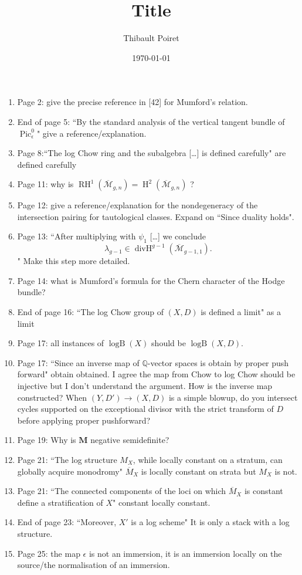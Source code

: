 \documentclass[a4paper,12pt]{amsart} %
\title[Title]{Title}
\author[T. Poiret]{Thibault Poiret}
\date{\today}
\numberwithin{equation}{subsection}
\newcommand{\on}[1]{\operatorname{#1}}
\newcommand{\bb}[1]{{\mathbb{#1}}}
\newcommand{\ca}[1]{{\mathcal{#1}}}
\def\Pic{\operatorname{Pic}}
\def\o#1{\overline{#1}}
\theoremstyle{definition}
\theoremstyle{plain}%
\theoremstyle{remark}
\begin{document}
\begin{enumerate}
	\item Page 2: give the precise reference in [42] for Mumford's relation.
	\item End of page 5: ``By the standard analysis of the vertical tangent bundle of $\Pic^0_{\epsilon}$" give a reference/explanation.
	\item Page 8:``The log Chow ring and the subalgebra [\ldots] is defined carefully" \textrightarrow{} are defined carefully
	\item Page 11: why is $\on{RH}^1(\o{\ca M}_{g,n})=\on{H}^2(\o{\ca M}_{g,n})$ ?
	\item Page 12: give a reference/explanation for the nondegeneracy of the intersection pairing for tautological classes. Expand on ``Since duality holds".
	\item Page 13: ``After multiplying with $\psi_1$ [\ldots] we conclude
	\[
	\lambda_{g-1}\in\on{divH}^{g-1}(\o{\ca M}_{g-1,1}).
	\]" Make this step more detailed.
	\item Page 14: what is Mumford's formula for the Chern character of the Hodge bundle?
	\item End of page 16: ``The log Chow group of $(X,D)$ is defined a limit" \textrightarrow{} as a limit
	\item Page 17: all instances of $\on{logB}(X)$ should be $\on{logB}(X,D)$.
	\item Page 17: ``Since an inverse map of $\bb Q$-vector spaces is obtain by proper push forward" obtain \textrightarrow{} obtained. I agree the map from Chow to log Chow should be injective but I don't understand the argument. How is the inverse map constructed? When $(Y,D') \to (X,D)$ is a simple blowup, do you intersect cycles supported on the exceptional divisor with the strict transform of $D$ before applying proper pushforward?
	\item Page 19: Why is $\mathbf M$ negative semidefinite?
	\item Page 21: ``The log structure $M_X$, while locally constant on a stratum, can globally acquire monodromy" $\o M_X$ is locally constant on strata but $M_X$ is not.
	\item Page 21: ``The connected components of the loci on which $\o M_X$ is constant define a stratification of $X$" constant \textrightarrow{} locally constant.
	\item End of page 23: ``Moreover, $X'$ is a log scheme" It is only a stack with a log structure.
	\item Page 25: the map $\epsilon$ is not an immersion, it is an immersion locally on the source/the normalisation of an immersion.
\end{enumerate}
\end{document}
